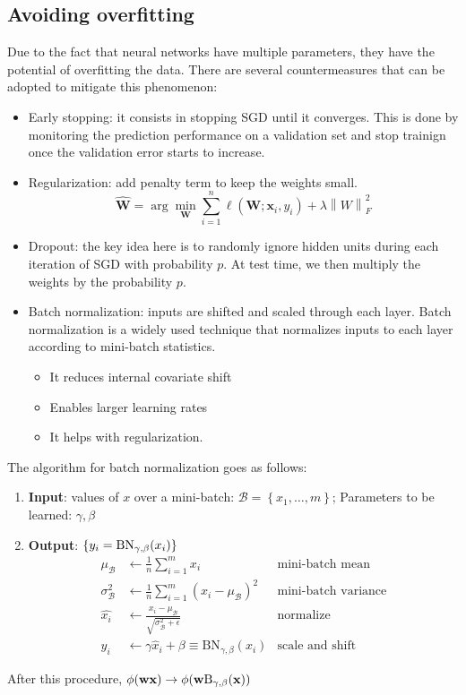 \documentclass[a4paper,10pt,twoside]{article}
\newcommand\norm[1]{\left\lVert#1\right\rVert}
\begin{document}
\subsection{Avoiding overfitting}

Due to the fact that neural networks have multiple parameters, they have the potential of overfitting the data. There are several countermeasures that can be adopted to mitigate this phenomenon:
\begin{itemize}
    \item Early stopping: it consists in stopping SGD until it converges. This is done by monitoring the prediction performance on a validation set and stop trainign once the validation error starts to increase.
    \item Regularization: add penalty term to keep the weights small.
    \begin{equation*}
        \hat{\mathbf{W}}=\arg\min_{\mathbf{W}}\sum_{i=1}^{n}\ell(\mathbf{W};\mathbf{x}_i,y_i)+\lambda\norm{W}_{F}^2
    \end{equation*}
    \item Dropout: the key idea here is to randomly ignore hidden units during each iteration of SGD with probability $p$. At test time, we then multiply the weights by the probability $p$.
    \item Batch normalization: inputs are shifted and scaled through each layer. Batch normalization is a widely used technique that normalizes inputs to each layer according to mini-batch statistics.
    \begin{itemize}
        \item It reduces internal covariate shift
        \item Enables larger learning rates
        \item It helps with regularization.
    \end{itemize}
\end{itemize}

The algorithm for batch normalization goes as follows:
\begin{enumerate}
    \item \textbf{Input}: values of $x$ over a mini-batch: $\mathcal{B}=\left\{x_1,\ldots,m\right\}$; Parameters to be learned: $\gamma,\beta$
    \item \textbf{Output}: $\left\{y_i=\textnormal{BN}_{\gamma,\beta}(x_i)\right\}$
    \begin{align*}
        \mu_{\mathcal{B}}&\leftarrow\frac{1}{n}\sum_{i=1}^{m}x_i &\text{mini-batch mean}\\
        \sigma_{\mathcal{B}}^2&\leftarrow\frac{1}{n}\sum_{i=1}^{m}(x_i-\mu_{\mathcal{B}})^2&\text{mini-batch variance}\\
        \hat{x_i}&\leftarrow \frac{x_i-\mu_{\mathcal{B}}}{\sqrt{\sigma_{\mathcal{B}}^2+\epsilon}}&\text{normalize}\\
        y_i&\leftarrow \gamma\hat{x}_i+\beta\equiv\text{BN}_{\gamma, \beta}(x_i)&\text{scale and shift}
    \end{align*}
\end{enumerate}
After this procedure, $\phi(\mathbf{w}\mathbf{x})\rightarrow\phi(\mathbf{w}\textnormal{B}_{\gamma,\beta}(\mathbf{x}))$
\end{document}
